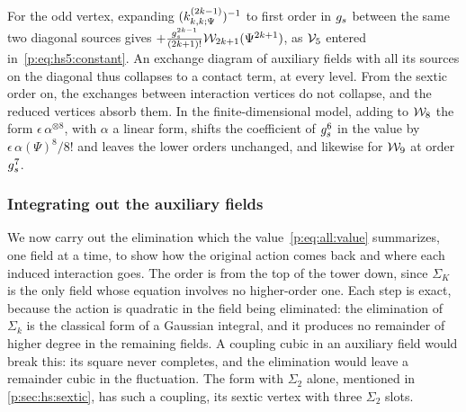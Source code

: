 For the odd vertex, expanding $(\kin{k}{\Psi}{2 k - 1})^{-1}$ to first order in $g_s$ between the same two diagonal sources gives $+ \tfrac{g_s^{2 k - 1}}{(2 k + 1)!} \mathcal{W}_{2 k + 1}(\Psi^{2 k + 1})$, as $\mathcal{V}_{5}$ entered in~\eqref{p:eq:hs5:constant}.
An exchange diagram of auxiliary fields with all its sources on the diagonal thus collapses to a contact term, at every level.
From the sextic order on, the exchanges between interaction vertices do not collapse, and the reduced vertices absorb them.
In the finite-dimensional model, adding to $\mathcal{W}_{8}$ the form $\epsilon \, \alpha^{\otimes 8}$, with $\alpha$ a linear form, shifts the coefficient of $g_s^6$ in the value by $\epsilon \, \alpha(\Psi)^8 / 8!$ and leaves the lower orders unchanged, and likewise for $\mathcal{W}_{9}$ at order $g_s^7$.

\subsubsection{Integrating out the auxiliary fields}
\label{p:sec:all:integrating-out}

We now carry out the elimination which the value~\eqref{p:eq:all:value} summarizes, one field at a time, to show how the original action comes back and where each induced interaction goes.
The order is from the top of the tower down, since $\Sigma_K$ is the only field whose equation involves no higher-order one.
Each step is exact, because the action is quadratic in the field being eliminated: the elimination of $\Sigma_k$ is the classical form of a Gaussian integral, and it produces no remainder of higher degree in the remaining fields.
A coupling cubic in an auxiliary field would break this: its square never completes, and the elimination would leave a remainder cubic in the fluctuation.
The form with $\Sigma_2$ alone, mentioned in \cref{p:sec:hs:sextic}, has such a coupling, its sextic vertex with three $\Sigma_2$ slots.

